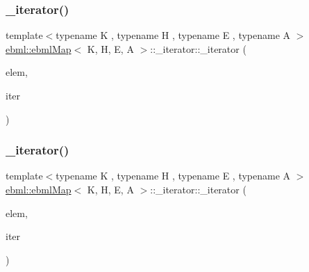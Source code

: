\subsubsection{\texorpdfstring{\+\_\+iterator()}{\_iterator()}\hspace{0.1cm}{\footnotesize\ttfamily [1/3]}}
{\footnotesize\ttfamily template$<$typename K , typename H , typename E , typename A $>$ \\
\mbox{\hyperlink{classebml_1_1ebmlMap}{ebml\+::ebml\+Map}}$<$ K, H, E, A $>$\+::\+\_\+iterator\+::\+\_\+iterator (\begin{DoxyParamCaption}\item[{const \mbox{\hyperlink{namespaceebml_adad533b7705a16bb360fe56380c5e7be}{ebml\+Element\+\_\+sp}} \&}]{elem,  }\item[{const typename std\+::unordered\+\_\+map$<$ K, \mbox{\hyperlink{namespaceebml_adad533b7705a16bb360fe56380c5e7be}{ebml\+Element\+\_\+sp}}, H, E, A $>$\+::\mbox{\hyperlink{classebml_1_1ebmlMasterElement_1_1iterator}{iterator}} \&}]{iter }\end{DoxyParamCaption})\hspace{0.3cm}{\ttfamily [protected]}}

\mbox{\label{classebml_1_1ebmlMap_1_1__iterator_a0664de1ae97c95b30c3b08b40c4b8b6e}} 
\subsubsection{\texorpdfstring{\+\_\+iterator()}{\_iterator()}\hspace{0.1cm}{\footnotesize\ttfamily [2/3]}}
{\footnotesize\ttfamily template$<$typename K , typename H , typename E , typename A $>$ \\
\mbox{\hyperlink{classebml_1_1ebmlMap}{ebml\+::ebml\+Map}}$<$ K, H, E, A $>$\+::\+\_\+iterator\+::\+\_\+iterator (\begin{DoxyParamCaption}\item[{\mbox{\hyperlink{namespaceebml_adad533b7705a16bb360fe56380c5e7be}{ebml\+Element\+\_\+sp}} \&\&}]{elem,  }\item[{typename std\+::unordered\+\_\+map$<$ K, \mbox{\hyperlink{namespaceebml_adad533b7705a16bb360fe56380c5e7be}{ebml\+Element\+\_\+sp}}, H, E, A $>$\+::\mbox{\hyperlink{classebml_1_1ebmlMasterElement_1_1iterator}{iterator}} \&\&}]{iter }\end{DoxyParamCaption})\hspace{0.3cm}{\ttfamily [protected]}}

